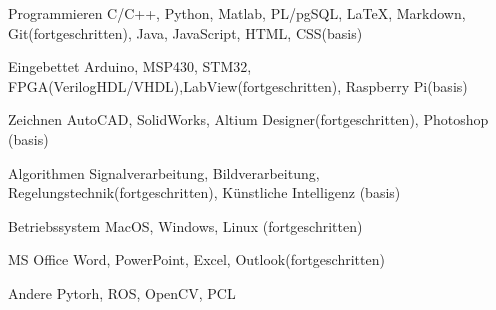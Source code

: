 

\begin{cvskills}

  \cvskill
    {Programmieren} %
    {C/C++, Python, Matlab, PL/pgSQL, \LaTeX, Markdown, Git(fortgeschritten), Java, JavaScript, HTML, CSS(basis)} %

  \cvskill
    {Eingebettet} %
    {Arduino, MSP430, STM32,  FPGA(VerilogHDL/VHDL),LabView(fortgeschritten), Raspberry Pi(basis)} %

  \cvskill
    {Zeichnen} %
    {AutoCAD, SolidWorks, Altium Designer(fortgeschritten), Photoshop (basis)} %

  \cvskill
    {Algorithmen} %
    {Signalverarbeitung, Bildverarbeitung, Regelungstechnik(fortgeschritten), Künstliche Intelligenz (basis)} %

  \cvskill
	{Betriebssystem} %
	{MacOS, Windows, Linux (fortgeschritten)} %

  \cvskill
	{MS Office} %
	{Word, PowerPoint, Excel, Outlook(fortgeschritten)} %

 \cvskill
   {Andere} %
   {Pytorh, ROS, OpenCV, PCL} %

\end{cvskills}
